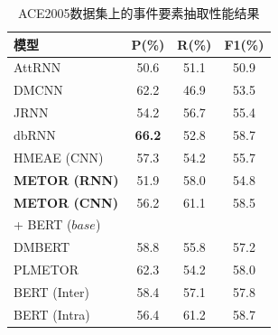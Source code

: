 \begin{table}[htp]
\centering
\caption{ACE2005数据集上的事件要素抽取性能结果}
\label{overall_4_4}
\begin{tabular}{lccc}
\toprule
\multicolumn{1}{l|}{模型}       & P(\%)                          & R(\%)                          & F1(\%)                         \\ \midrule
\multicolumn{1}{l|}{AttRNN}        & 50.6                           & 51.1                           & 50.9                         \\
\multicolumn{1}{l|}{DMCNN}        & 62.2                           & 46.9                           & 53.5                           \\
\multicolumn{1}{l|}{JRNN}         & 54.2                           & 56.7                           & 55.4                           \\
\multicolumn{1}{l|}{dbRNN}        & \textbf{66.2}                & 52.8                           & 58.7                           \\
\multicolumn{1}{l|}{HMEAE (CNN)}  & 57.3                           & 54.2                           & 55.7                           \\
\multicolumn{1}{l|}{\textbf{METOR (RNN)}}   & 51.9      &  58.0      &  54.8 \\
\multicolumn{1}{l|}{\textbf{METOR (CNN)}}   & 56.2      & 61.1     & 58.5  \\ \midrule
+ BERT ($base$)               &                                &                                &                                \\ \midrule
\multicolumn{1}{l|}{DMBERT}       & 58.8                           & 55.8                           & 57.2                           \\
\multicolumn{1}{l|}{PLMETOR}        & 62.3                           & 54.2                           & 58.0                           \\
\multicolumn{1}{l|}{BERT (Inter)} & 58.4                           & 57.1                           & 57.8                           \\
\multicolumn{1}{l|}{BERT (Intra)} & 56.4                           & 61.2                           & 58.7                           \\

\end{tabular}
\end{table}
